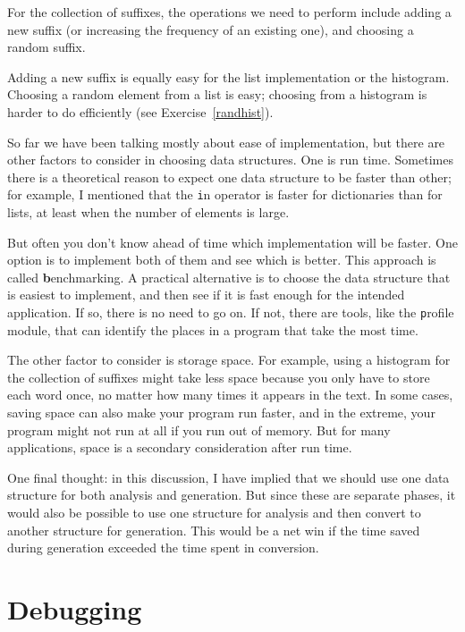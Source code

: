 \documentclass[
DIV=11,
fontsize=12,
twoside,
headinclude=false,
titlepage=firstiscover,
abstract=true,
headsepline=true,
footsepline=true,
chapterprefix=true, %
headings=big,
bibliography=totoc,%
captions=tableheading
]{scrbook}
\theoremstyle{definition}
\begin{document}
For the collection of suffixes, the operations we need to
perform include adding a new suffix (or increasing the frequency
of an existing one), and choosing a random suffix.

Adding a new suffix is equally easy for the list implementation
or the histogram.  Choosing a random element from a list
is easy; choosing from a histogram is harder to do
efficiently (see Exercise~\ref{randhist}).

So far we have been talking mostly about ease of implementation,
but there are other factors to consider in choosing data structures.
One is run time.  Sometimes there is a theoretical reason to expect
one data structure to be faster than other; for example, I mentioned
that the {\texttt in} operator is faster for dictionaries than for lists,
at least when the number of elements is large.

But often you don't know ahead of time which implementation will
be faster.  One option is to implement both of them and see which
is better.  This approach is called {\textbf benchmarking}.  A practical
alternative is to choose the data structure that is
easiest to implement, and then see if it is fast enough for the
intended application.  If so, there is no need to go on.  If not,
there are tools, like the {\texttt profile} module, that can identify
the places in a program that take the most time.

The other factor to consider is storage space.  For example, using a
histogram for the collection of suffixes might take less space because
you only have to store each word once, no matter how many times it
appears in the text.  In some cases, saving space can also make your
program run faster, and in the extreme, your program might not run at
all if you run out of memory.  But for many applications, space is a
secondary consideration after run time.

One final thought: in this discussion, I have implied that
we should use one data structure for both analysis and generation.  But
since these are separate phases, it would also be possible to use one
structure for analysis and then convert to another structure for
generation.  This would be a net win if the time saved during
generation exceeded the time spent in conversion.


\section{Debugging}
\end{document}
